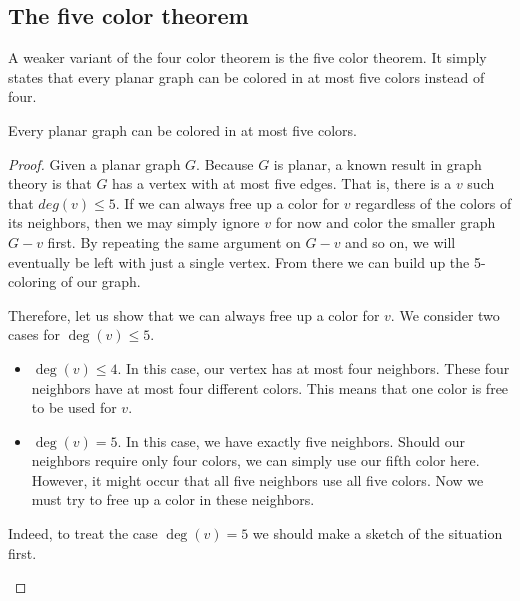 \subsection{The five color theorem}
A weaker variant of the four color theorem is the five color theorem. It simply states that every planar graph can be colored in at most five colors instead of four.

\begin{theorem}
    Every planar graph can be colored in at most five colors.
\end{theorem}

\begin{proof}
Given a planar graph $G$. Because $G$ is planar, a known result in graph theory is that $G$ has a vertex with at most five edges. That is, there is a $v$ such that $deg(v) \leq 5$. If we can always free up a color for $v$ regardless of the colors of its neighbors, then we may simply ignore $v$ for now and color the smaller graph $G-v$ first. By repeating the same argument on $G-v$ and so on, we will eventually be left with just a single vertex. From there we can build up the 5-coloring of our graph.

Therefore, let us show that we can always free up a color for $v$. We consider two cases for $\deg(v) \leq 5$.

\begin{itemize}
    \item $\deg(v) \leq 4$. In this case, our vertex has at most four neighbors. These four neighbors have at most four different colors. This means that one color is free to be used for $v$.
    \item $\deg(v) = 5$. In this case, we have exactly five neighbors. Should our neighbors require only four colors, we can simply use our fifth color here. However, it might occur that all five neighbors use all five colors. Now we must try to free up a color in these neighbors.
\end{itemize}

Indeed, to treat the case $\deg(v)=5$ we should make a sketch of the situation first.

\begin{figure}[!h]
    \centering
\end{figure}
\end{proof}
